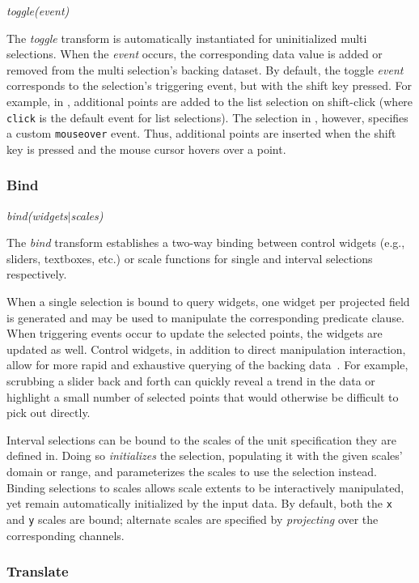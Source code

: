 \centerline{\emph{toggle(event)}}

The \emph{toggle} transform is automatically instantiated for uninitialized
multi selections. When the \emph{event} occurs, the corresponding data value is
added or removed from the multi selection's backing dataset. By default, the
toggle \emph{event} corresponds to the selection's triggering event, but with
the shift key pressed. For example, in , additional
points are added to the list selection on shift-click (where \texttt{click} is
the default event for list selections). The selection in
, however, specifies a custom \texttt{mouseover} event.
Thus, additional points are inserted when the shift key is pressed and the mouse
cursor hovers over a point.

\subsubsection{Bind}

\centerline{\emph{bind(widgets$|$scales)}}

The \emph{bind} transform establishes a two-way binding between control widgets
(e.g., sliders, textboxes, etc.) or scale functions for single and interval
selections respectively.

When a single selection is bound to query widgets, one widget per projected
field is generated and may be used to manipulate the corresponding predicate
clause. When triggering events occur to update the selected points, the widgets
are updated as well. Control widgets, in addition to direct manipulation
interaction, allow for more rapid and exhaustive querying of the backing
data~\cite{shneiderman:dynamicqueries}. For example, scrubbing a slider back and
forth can quickly reveal a trend in the data or highlight a small number of
selected points that would otherwise be difficult to pick out directly.

Interval selections can be bound to the scales of the unit specification they
are defined in. Doing so \emph{initializes} the selection, populating it with
the given scales' domain or range, and parameterizes the scales to use the
selection instead. Binding selections to scales allows scale extents to be
interactively manipulated, yet remain automatically initialized by the input
data. By default, both the \texttt{x} and \texttt{y} scales are bound; alternate
scales are specified by \emph{projecting} over the corresponding channels.

\subsubsection{Translate}

